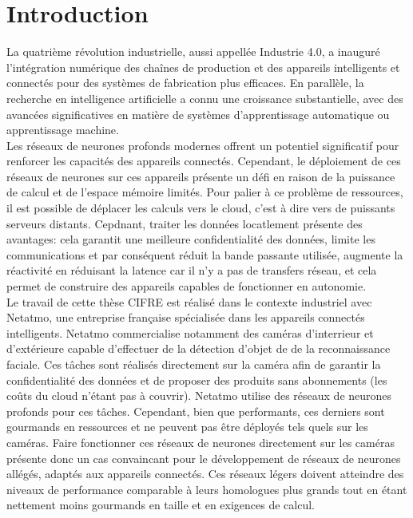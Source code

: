 \section*{Introduction}

La quatrième révolution industrielle, aussi appellée Industrie 4.0, a inauguré
l'intégration numérique des chaînes de production et des appareils intelligents
et connectés pour des systèmes de fabrication plus efficaces. En parallèle, la
recherche en intelligence artificielle a connu une croissance substantielle,
avec des avancées significatives en matière de systèmes d'apprentissage
automatique ou apprentissage machine.\\

Les réseaux de neurones profonds modernes offrent un potentiel significatif pour
renforcer les capacités des appareils connectés. Cependant, le déploiement  de
ces réseaux de neurones sur ces appareils présente un défi en raison de la
puissance de calcul et de l'espace mémoire limités. Pour palier à ce problème de
ressources, il est possible de déplacer les calculs vers le cloud, c'est à dire
vers de puissants serveurs distants. Cepdnant, traiter les données locatlement
présente des avantages: cela garantit une meilleure confidentialité des données,
limite les communications et par conséquent réduit la bande passante utilisée,
augmente la réactivité en réduisant la latence car il n'y a pas de transfers
réseau, et cela permet de construire des appareils capables de fonctionner en
autonomie.\\

Le travail de cette thèse CIFRE est réalisé dans le contexte industriel avec
Netatmo, une entreprise française spécialisée dans les appareils connectés
intelligents. Netatmo commercialise notamment des caméras d'interrieur et
d'extérieure capable d'effectuer de la détection d'objet de de la reconnaissance
faciale. Ces tâches sont réalisés directement sur la caméra afin de garantir la
confidentialité des données et de proposer des produits sans abonnements (les
coûts du cloud n'étant pas à couvrir). Netatmo utilise des réseaux de neurones
profonds pour ces tâches. Cependant, bien que performants, ces derniers sont
gourmands en ressources et ne peuvent pas être déployés tels quels sur les
caméras. Faire fonctionner ces réseaux de neurones directement sur les caméras
présente donc un cas convaincant pour le développement de réseaux de neurones
allégés, adaptés aux appareils connectés. Ces réseaux légers doivent atteindre
des niveaux de performance comparable à leurs homologues plus grands tout en
étant nettement moins gourmands en taille et en exigences de calcul.\\

